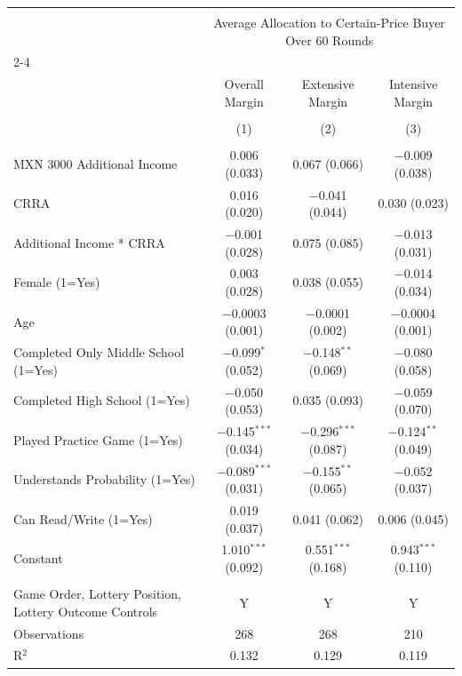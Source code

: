 
\begin{table}[!htbp] \centering 
   
   
\begin{tabular}{@{\extracolsep{5pt}}lccc} 
\\[-1.8ex]\hline 
\hline \\[-1.8ex] 
 & \multicolumn{3}{c}{Average Allocation to Certain-Price Buyer Over 60 Rounds} \\ 
\cline{2-4} 
\\[-1.8ex] & Overall Margin & Extensive Margin & Intensive Margin \\ 
\\[-1.8ex] & (1) & (2) & (3)\\ 
\hline \\[-1.8ex] 
 MXN 3000 Additional Income & 0.006 (0.033) & 0.067 (0.066) & $-$0.009 (0.038) \\ 
  CRRA & 0.016 (0.020) & $-$0.041 (0.044) & 0.030 (0.023) \\ 
  Additional Income * CRRA & $-$0.001 (0.028) & 0.075 (0.085) & $-$0.013 (0.031) \\ 
  Female (1=Yes) & 0.003 (0.028) & 0.038 (0.055) & $-$0.014 (0.034) \\ 
  Age & $-$0.0003 (0.001) & $-$0.0001 (0.002) & $-$0.0004 (0.001) \\ 
  Completed Only Middle School (1=Yes) & $-$0.099$^{*}$ (0.052) & $-$0.148$^{**}$ (0.069) & $-$0.080 (0.058) \\ 
  Completed High School (1=Yes) & $-$0.050 (0.053) & 0.035 (0.093) & $-$0.059 (0.070) \\ 
  Played Practice Game (1=Yes) & $-$0.145$^{***}$ (0.034) & $-$0.296$^{***}$ (0.087) & $-$0.124$^{**}$ (0.049) \\ 
  Understands Probability (1=Yes) & $-$0.089$^{***}$ (0.031) & $-$0.155$^{**}$ (0.065) & $-$0.052 (0.037) \\ 
  Can Read/Write (1=Yes) & 0.019 (0.037) & 0.041 (0.062) & 0.006 (0.045) \\ 
  Constant & 1.010$^{***}$ (0.092) & 0.551$^{***}$ (0.168) & 0.943$^{***}$ (0.110) \\ 
 \hline \\[-1.8ex] 
Game Order, Lottery Position, Lottery Outcome Controls & Y & Y & Y \\ 
Observations & 268 & 268 & 210 \\ 
R$^{2}$ & 0.132 & 0.129 & 0.119 \\ 

\end{tabular}
\end{table}
